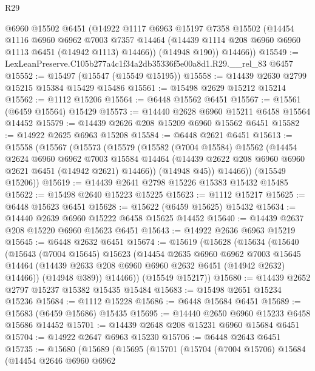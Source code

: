 \begin{lexlean}{R29}
\begin{coremodule}
        @6960
        @15502
        @6451
        (@14922
          @1117
          @6963
          @15197
          @7358
          @15502
          (@14454
            @1116
            @6960
            @6962
            @7003
            @7357
            @14464
            (@14439 @1114 @208 @6960 @6960 @1113 @6451 (@14942 @1113) @14466))
          (@14948 @190))
        @14466))
@15549 := LexLeanPreserve.C105b277a4c1f34a2db35336f5e00a8d1.R29.__rel_83 @6457
@15552 := @15497 (@15547 (@15549 @15195))
@15558 := @14439 @2630 @2799 @15215 @15384 @15429 @15486
@15561 := @15498 @2629 @15212 @15214
@15562 := @1112 @15206
@15564 := @6448 @15562 @6451
@15567 := @15561 (@6459 @15564) @15429
@15573 := @14440 @2628 @6960 @15211 @6458 @15564 @14452
@15579 := @14439 @2626 @208 @15209 @6960 @15562 @6451
@15582 := @14922 @2625 @6963 @15208
@15584 := @6448 @2621 @6451
@15613 := @15558
    (@15567
      (@15573
        (@15579
          (@15582
            (@7004 @15584)
            @15562
            (@14454
              @2624
              @6960
              @6962
              @7003
              @15584
              @14464
              (@14439 @2622 @208 @6960 @6960 @2621 @6451 (@14942 @2621) @14466))
            (@14948 @45))
          @14466))
      (@15549 @15206))
@15619 := @14439 @2641 @2798 @15226 @15383 @15432 @15485
@15622 := @15498 @2640 @15223 @15225
@15623 := @1112 @15217
@15625 := @6448 @15623 @6451
@15628 := @15622 (@6459 @15625) @15432
@15634 := @14440 @2639 @6960 @15222 @6458 @15625 @14452
@15640 := @14439 @2637 @208 @15220 @6960 @15623 @6451
@15643 := @14922 @2636 @6963 @15219
@15645 := @6448 @2632 @6451
@15674 := @15619
    (@15628
      (@15634
        (@15640
          (@15643
            (@7004 @15645)
            @15623
            (@14454
              @2635
              @6960
              @6962
              @7003
              @15645
              @14464
              (@14439 @2633 @208 @6960 @6960 @2632 @6451 (@14942 @2632) @14466))
            (@14948 @389))
          @14466))
      (@15549 @15217))
@15680 := @14439 @2652 @2797 @15237 @15382 @15435 @15484
@15683 := @15498 @2651 @15234 @15236
@15684 := @1112 @15228
@15686 := @6448 @15684 @6451
@15689 := @15683 (@6459 @15686) @15435
@15695 := @14440 @2650 @6960 @15233 @6458 @15686 @14452
@15701 := @14439 @2648 @208 @15231 @6960 @15684 @6451
@15704 := @14922 @2647 @6963 @15230
@15706 := @6448 @2643 @6451
@15735 := @15680
    (@15689
      (@15695
        (@15701
          (@15704
            (@7004 @15706)
            @15684
            (@14454
              @2646
              @6960
              @6962

\end{coremodule}
\end{lexlean}
